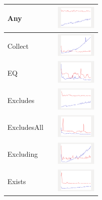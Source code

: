 \begin{longtable}{ m{2.5cm} m{8cm} m{2cm} }
  Any &
  
  & 
  	\includegraphics[width=2cm]{graphs/set/small/Any}
  \\\hline
  
  Collect &

&
\includegraphics[width=2cm]{graphs/set/small/Collect}
\\\hline

EQ &

&
\includegraphics[width=2cm]{graphs/set/small/EQ}
\\\hline

Excludes &

&
\includegraphics[width=2cm]{graphs/set/small/Excludes}
\\\hline

ExcludesAll &

&
\includegraphics[width=2cm]{graphs/set/small/ExcludesAll}
\\\hline

Excluding &

&
\includegraphics[width=2cm]{graphs/set/small/Excluding}
\\\hline

Exists &

&
\includegraphics[width=2cm]{graphs/set/small/Exists}
\\\hline


\end{longtable}
